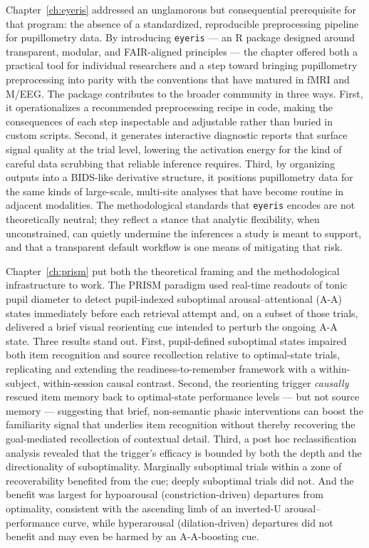 Chapter~\ref{ch:eyeris} addressed an unglamorous but consequential prerequisite for that program: the absence of a standardized, reproducible preprocessing pipeline for pupillometry data. By introducing \texttt{eyeris} --- an R package designed around transparent, modular, and FAIR-aligned principles --- the chapter offered both a practical tool for individual researchers and a step toward bringing pupillometry preprocessing into parity with the conventions that have matured in fMRI and M/EEG. The package contributes to the broader community in three ways. First, it operationalizes a recommended preprocessing recipe in code, making the consequences of each step inspectable and adjustable rather than buried in custom scripts. Second, it generates interactive diagnostic reports that surface signal quality at the trial level, lowering the activation energy for the kind of careful data scrubbing that reliable inference requires. Third, by organizing outputs into a BIDS-like derivative structure, it positions pupillometry data for the same kinds of large-scale, multi-site analyses that have become routine in adjacent modalities. The methodological standards that \texttt{eyeris} encodes are not theoretically neutral; they reflect a stance that analytic flexibility, when unconstrained, can quietly undermine the inferences a study is meant to support, and that a transparent default workflow is one means of mitigating that risk.

Chapter~\ref{ch:prism} put both the theoretical framing and the methodological infrastructure to work. The PRISM paradigm used real-time readouts of tonic pupil diameter to detect pupil-indexed suboptimal arousal--attentional (A-A) states immediately before each retrieval attempt and, on a subset of those trials, delivered a brief visual reorienting cue intended to perturb the ongoing A-A state. Three results stand out. First, pupil-defined suboptimal states impaired both item recognition and source recollection relative to optimal-state trials, replicating and extending the readiness-to-remember framework with a within-subject, within-session causal contrast. Second, the reorienting trigger \textit{causally} rescued item memory back to optimal-state performance levels --- but not source memory --- suggesting that brief, non-semantic phasic interventions can boost the familiarity signal that underlies item recognition without thereby recovering the goal-mediated recollection of contextual detail. Third, a post hoc reclassification analysis revealed that the trigger's efficacy is bounded by both the depth and the directionality of suboptimality. Marginally suboptimal trials within a zone of recoverability benefited from the cue; deeply suboptimal trials did not. And the benefit was largest for hypoarousal (constriction-driven) departures from optimality, consistent with the ascending limb of an inverted-U arousal--performance curve, while hyperarousal (dilation-driven) departures did not benefit and may even be harmed by an A-A-boosting cue.

